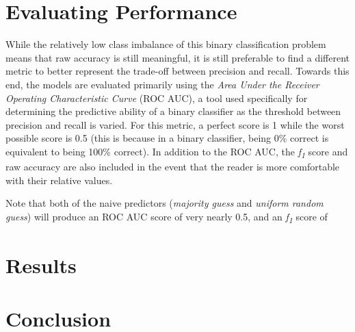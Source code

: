 \documentclass[10pt,conference]{IEEEtran}
\begin{document}
\section{Evaluating Performance}
 While the relatively low class imbalance of this binary classification problem means that raw accuracy is still meaningful, it is still preferable to find a different metric to better represent the trade-off between precision and recall. Towards this end, the models are evaluated primarily using the \emph{Area Under the Receiver Operating Characteristic Curve} (ROC AUC), a tool used specifically for determining the predictive ability of a binary classifier as the threshold between precision and recall is varied\cite{Fawcett2006}. For this metric, a perfect score is 1 while the worst possible score is 0.5 (this is because in a binary classifier, being 0\% correct is equivalent to being 100\% correct). In addition to the ROC AUC, the \emph{f\textsubscript{1}} score\cite{rijsbergen_1995} and raw accuracy are also included in the event that the reader is more comfortable with their relative values.
 
 Note that both of the naive predictors (\emph{majority guess} and \emph{uniform random guess}) will produce an ROC AUC score of very nearly 0.5, and an \emph{f\textsubscript{1}} score of 
\section{Results}


\section{Conclusion}

\nocite{*}




\vspace{12pt}
\end{document}
